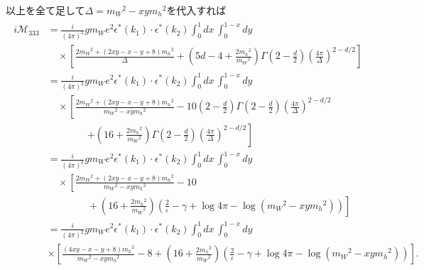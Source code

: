 以上を全て足して\(\Delta = m_W{}^2 - xym_h{}^2\)を代入すれば
\begin{align}
  \begin{split}
    i\mathcal{M}_{333} &= \frac{i}{(4\pi)^2} g m_W e^2 \epsilon^\ast(k_1) \cdot \epsilon^\ast(k_2) \int_0^1 dx\, \int_0^{1-x} dy \\
    &\quad \times \left[ \frac{2m_W{}^2 + (2xy-x-y+8)m_h{}^2}{\Delta} + \left( 5d-4 + \frac{2m_h{}^2}{m_W{}^2} \right) \Gamma\left(2-\frac{d}{2}\right) \left(\frac{4\pi}{\Delta}\right)^{2-d/2} \right] \\
    &= \frac{i}{(4\pi)^2} g m_W e^2 \epsilon^\ast(k_1) \cdot \epsilon^\ast(k_2) \int_0^1 dx\, \int_0^{1-x} dy \\
    &\quad \times \left[ \frac{2m_W{}^2 + (2xy-x-y+8)m_h{}^2}{m_W{}^2-xym_h{}^2}
    - 10 \left(2 - \frac{d}{2}\right) \Gamma\left(2-\frac{d}{2}\right) \left(\frac{4\pi}{\Delta}\right)^{2-d/2} \right. \\
    &\qquad\qquad \left. + \left( 16 + \frac{2m_h{}^2}{m_W{}^2} \right) \Gamma\left(2-\frac{d}{2}\right) \left(\frac{4\pi}{\Delta}\right)^{2-d/2} \right] \\
    &= \frac{i}{(4\pi)^2} g m_W e^2 \epsilon^\ast(k_1) \cdot \epsilon^\ast(k_2) \int_0^1 dx\, \int_0^{1-x} dy \\
    &\quad \times \left[ \frac{2m_W{}^2 + (2xy-x-y+8)m_h{}^2}{m_W{}^2-xym_h{}^2} - 10 \right. \\
    &\qquad\qquad + \left. \left( 16 + \frac{2m_h{}^2}{m_W{}^2} \right) \left( \frac{2}{\varepsilon} - \gamma + \log 4\pi - \log(m_W{}^2 - xym_h{}^2) \right) \right] \\
    &= \frac{i}{(4\pi)^2} g m_W e^2 \epsilon^\ast(k_1) \cdot \epsilon^\ast(k_2) \int_0^1 dx\, \int_0^{1-x} dy \\
    &\times \left[ \frac{(4xy-x-y+8)m_h{}^2}{m_W{}^2-xym_h{}^2} - 8
    + \left( 16 + \frac{2m_h{}^2}{m_W{}^2} \right) \left( \frac{2}{\varepsilon} - \gamma + \log 4\pi - \log(m_W{}^2 - xym_h{}^2) \right) \right] .
  \end{split}
  \label{fp3_f_iM333}
\end{align}

